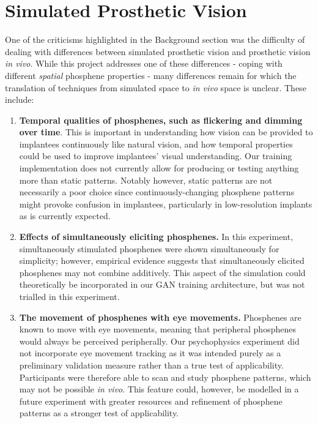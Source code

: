 \documentclass[a4paper,11pt,openany]{book}
\begin{document}
\section*{Simulated Prosthetic Vision}
\label{sec:orgeabbf8c}

One of the criticisms highlighted in the Background section was the difficulty of dealing with differences between simulated prosthetic vision and prosthetic vision \emph{in vivo}.
While this project addresses one of these differences - coping with different \emph{spatial} phosphene properties - many differences remain for which the translation of techniques from simulated space to \emph{in vivo} space is unclear.
These include:
\begin{enumerate}
\item \textbf{Temporal qualities of phosphenes, such as flickering and dimming over time}.
This is important in understanding how vision can be provided to implantees continuously like natural vision, and how temporal properties could be used to improve implantees' visual understanding.
Our training implementation does not currently allow for producing or testing anything more than static patterns.
Notably however, static patterns are not necessarily a poor choice since continuously-changing phosphene patterns might provoke confusion in implantees, particularly in low-resolution implants as is currently expected.
\item \textbf{Effects of simultaneously eliciting phosphenes.}
In this experiment, simultaneously stimulated phosphenes were shown simultaneously for simplicity; however, empirical evidence suggests that simultaneously elicited phosphenes may not combine additively.
This aspect of the simulation could theoretically be incorporated in our GAN training architecture, but was not trialled in this experiment.
\item \textbf{The movement of phosphenes with eye movements.}
Phosphenes are known to move with eye movements, meaning that peripheral phosphenes would always be perceived peripherally.
Our psychophysics experiment did not incorporate eye movement tracking as it was intended purely as a preliminary validation measure rather than a true test of applicability.
Participants were therefore able to scan and study phosphene patterns, which may not be possible \emph{in vivo}.
This feature could, however, be modelled in a future experiment with greater resources and refinement of phosphene patterns as a stronger test of applicability.
\end{enumerate}
\end{document}
